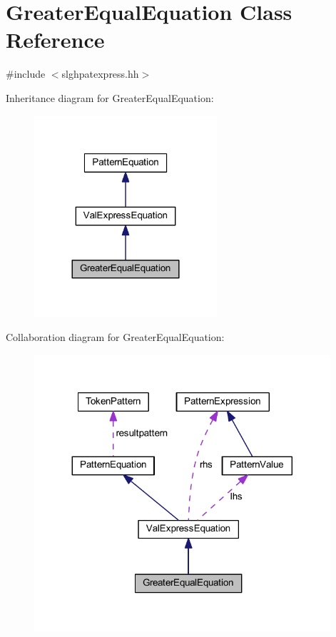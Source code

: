 \hypertarget{class_greater_equal_equation}{}\section{Greater\+Equal\+Equation Class Reference}
\label{class_greater_equal_equation}


{\ttfamily \#include $<$slghpatexpress.\+hh$>$}



Inheritance diagram for Greater\+Equal\+Equation\+:
\nopagebreak
\begin{figure}[H]
\begin{center}
\leavevmode
\includegraphics[width=192pt]{class_greater_equal_equation__inherit__graph}
\end{center}
\end{figure}


Collaboration diagram for Greater\+Equal\+Equation\+:
\nopagebreak
\begin{figure}[H]
\begin{center}
\leavevmode
\includegraphics[width=311pt]{class_greater_equal_equation__coll__graph}
\end{center}
\end{figure}
